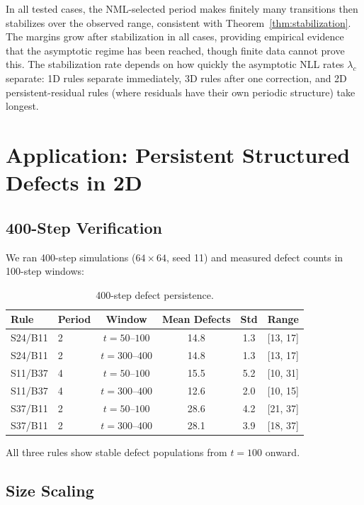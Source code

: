 \documentclass[11pt]{article}
\theoremstyle{definition}
\theoremstyle{remark}
\begin{document}
In all tested cases, the NML-selected period makes finitely many transitions then stabilizes over the observed range, consistent with Theorem~\ref{thm:stabilization}.
The margins grow after stabilization in all cases, providing empirical evidence that the asymptotic regime has been reached, though finite data cannot prove this.
The stabilization rate depends on how quickly the asymptotic NLL rates $\lambda_c$ separate: 1D rules separate immediately, 3D rules after one correction, and 2D persistent-residual rules (where residuals have their own periodic structure) take longest.

\section{Application: Persistent Structured Defects in 2D}

\subsection{400-Step Verification}

We ran 400-step simulations ($64 \times 64$, seed 11) and measured defect counts in 100-step windows:

\begin{table}[h]
\centering
\caption{400-step defect persistence.}
\begin{tabular}{llcccc}
\toprule
Rule & Period & Window & Mean Defects & Std & Range \\
\midrule
S24/B11 & 2 & $t{=}50$--$100$  & 14.8 & 1.3 & [13, 17] \\
S24/B11 & 2 & $t{=}300$--$400$ & 14.8 & 1.3 & [13, 17] \\
S11/B37 & 4 & $t{=}50$--$100$  & 15.5 & 5.2 & [10, 31] \\
S11/B37 & 4 & $t{=}300$--$400$ & 12.6 & 2.0 & [10, 15] \\
S37/B11 & 2 & $t{=}50$--$100$  & 28.6 & 4.2 & [21, 37] \\
S37/B11 & 2 & $t{=}300$--$400$ & 28.1 & 3.9 & [18, 37] \\
\bottomrule
\end{tabular}
\end{table}

All three rules show stable defect populations from $t{=}100$ onward.

\subsection{Size Scaling}
\end{document}
